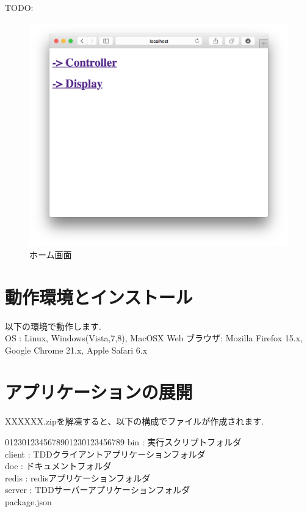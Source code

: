 \documentclass[a4paper,10pt,oneside]{jsbook}
\begin{document}
TODO:

\begin{figure}[htbp]
	\begin{center}
		\includegraphics[width=11.5cm]{image/home.png}
	\end{center}
	\caption{ホーム画面}
	\label{fig:home}
\end{figure}


\chapter{動作環境とインストール}
以下の環境で動作します.\\

OS : Linux, Windows(Vista,7,8), MacOSX
Web ブラウザ: Mozilla Firefox 15.x, Google Chrome 21.x, Apple Safari 6.x

\chapter{アプリケーションの展開}
XXXXXX.zipを解凍すると、以下の構成でファイルが作成されます.\\

\begin{tabbing}
0123\=01234567890123\=0123456789\kill
\>bin        \> : 実行スクリプトフォルダ\\
\>client     \> : TDDクライアントアプリケーションフォルダ\\
\>doc        \> : ドキュメントフォルダ\\
\>redis      \> : redisアプリケーションフォルダ\\
\>server     \> : TDDサーバーアプリケーションフォルダ\\
\>package.json
\end{tabbing}
\end{document}
